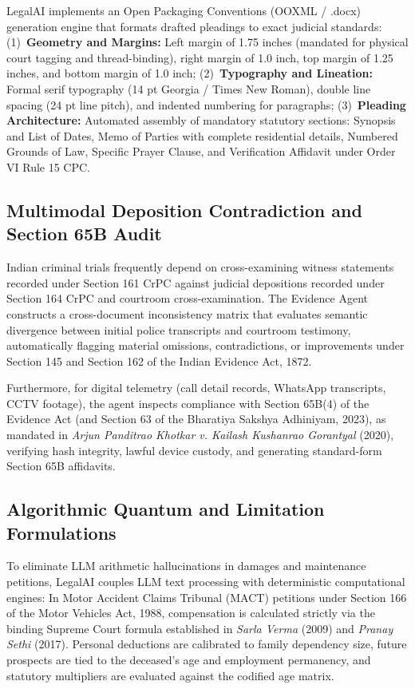 \documentclass[conference]{IEEEtran}
\begin{document}
LegalAI implements an Open Packaging Conventions (OOXML / .docx) generation engine that formats drafted pleadings to exact judicial standards:
(1)~\textbf{Geometry and Margins:} Left margin of 1.75 inches (mandated for physical court tagging and thread-binding), right margin of 1.0 inch, top margin of 1.25 inches, and bottom margin of 1.0 inch;
(2)~\textbf{Typography and Lineation:} Formal serif typography (14 pt Georgia / Times New Roman), double line spacing (24 pt line pitch), and indented numbering for paragraphs;
(3)~\textbf{Pleading Architecture:} Automated assembly of mandatory statutory sections: Synopsis and List of Dates, Memo of Parties with complete residential details, Numbered Grounds of Law, Specific Prayer Clause, and Verification Affidavit under Order VI Rule 15 CPC.

\subsection{Multimodal Deposition Contradiction and Section 65B Audit}
Indian criminal trials frequently depend on cross-examining witness statements recorded under Section 161 CrPC against judicial depositions recorded under Section 164 CrPC and courtroom cross-examination. The Evidence Agent constructs a cross-document inconsistency matrix that evaluates semantic divergence between initial police transcripts and courtroom testimony, automatically flagging material omissions, contradictions, or improvements under Section 145 and Section 162 of the Indian Evidence Act, 1872.

Furthermore, for digital telemetry (call detail records, WhatsApp transcripts, CCTV footage), the agent inspects compliance with Section 65B(4) of the Evidence Act (and Section 63 of the Bharatiya Sakshya Adhiniyam, 2023), as mandated in \emph{Arjun Panditrao Khotkar v. Kailash Kushanrao Gorantyal} (2020), verifying hash integrity, lawful device custody, and generating standard-form Section 65B affidavits.

\subsection{Algorithmic Quantum and Limitation Formulations}
To eliminate LLM arithmetic hallucinations in damages and maintenance petitions, LegalAI couples LLM text processing with deterministic computational engines:
In Motor Accident Claims Tribunal (MACT) petitions under Section 166 of the Motor Vehicles Act, 1988, compensation is calculated strictly via the binding Supreme Court formula established in \emph{Sarla Verma} (2009) and \emph{Pranay Sethi} (2017). Personal deductions are calibrated to family dependency size, future prospects are tied to the deceased's age and employment permanency, and statutory multipliers are evaluated against the codified age matrix.
\end{document}
